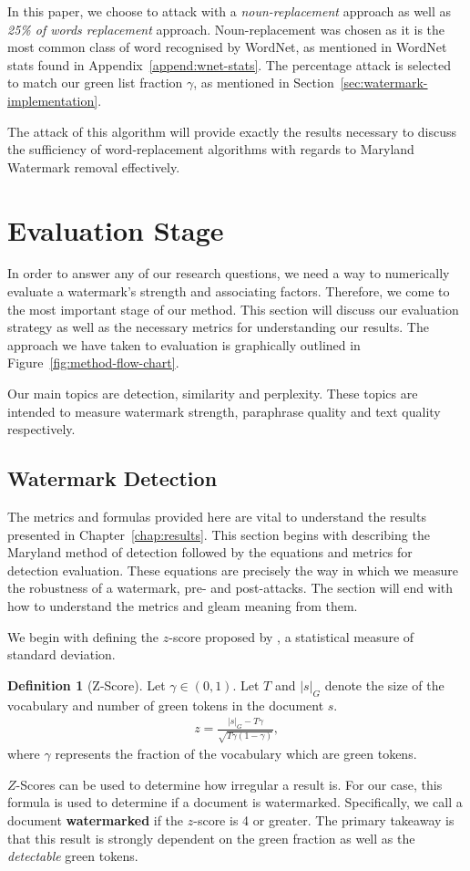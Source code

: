 \documentclass{l4proj}
\theoremstyle{definition}
\newtheorem{definition}{Definition}[section]
\begin{document}
        In this paper, we choose to attack with a \emph{noun-replacement} approach as well as \emph{25\% of words replacement} approach. Noun-replacement was chosen as it is the most common class of word recognised by WordNet, as mentioned in WordNet stats found in Appendix~\ref{append:wnet-stats}. The percentage attack is selected to match our green list fraction $\gamma$, as mentioned in Section~\ref{sec:watermark-implementation}. 

        The attack of this algorithm will provide exactly the results necessary to discuss the sufficiency of word-replacement algorithms with regards to Maryland Watermark removal effectively.

\section{Evaluation Stage}
    In order to answer any of our research questions, we need a way to numerically evaluate a watermark's strength and associating factors. Therefore, we come to the most important stage of our method. This section will discuss our evaluation strategy as well as the necessary metrics for understanding our results. The approach we have taken to evaluation is graphically outlined in Figure~\ref{fig:method-flow-chart}. 
    
    Our main topics are detection, similarity and perplexity. These topics are intended to measure watermark strength, paraphrase quality and text quality respectively. 
    
    \subsection{Watermark Detection}
        The metrics and formulas provided here are vital to understand the results presented in Chapter~\ref{chap:results}. This section begins with describing the Maryland method of detection followed by the equations and metrics for detection evaluation. These equations are precisely the way in which we measure the robustness of a watermark, pre- and post-attacks. The section will end with how to understand the metrics and gleam meaning from them.

        We begin with defining the $z$-score proposed by \citet{kirchenbauer2023watermark}, a statistical measure of standard deviation.
        \begin{definition}[Z-Score]
            Let $\gamma \in (0, 1)$. Let $T$ and $|s|_G$ denote the size of the vocabulary and number of green tokens in the document $s$.
            \begin{align*}
                z = \frac{|s|_G - T\gamma}{\sqrt{T\gamma(1 - \gamma)}},
            \end{align*}
            where $\gamma$ represents the fraction of the vocabulary which are green tokens.
        \end{definition}
        $Z$-Scores can be used to determine how irregular a result is. For our case, this formula is used to determine if a document is watermarked. Specifically, we call a document \textbf{watermarked} if the $z$-score is 4 or greater. The primary takeaway is that this result is strongly dependent on the green fraction as well as the \emph{detectable} green tokens. 
\end{document}
